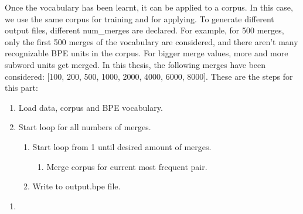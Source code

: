Once the vocabulary has been learnt, it can be applied to a corpus. In this case, we use the same corpus for training and for applying. To generate different output files, different num\_merges are declared. For example, for 500 merges, only the first 500 merges of the vocabulary are considered, and there aren't many recognizable BPE units in the corpus. For bigger merge values, more and more subword units get merged. In this thesis, the following merges have been considered: [100, 200, 500, 1000, 2000, 4000, 6000, 8000]. These are the steps for this part:

\begin{enumerate}
	\item Load data, corpus and BPE vocabulary.
	\item Start loop for all numbers of merges.
	\begin{enumerate}
		\item Start loop from 1 until desired amount of merges.
		\begin{enumerate}
			\item Merge corpus for current most frequent pair.
		\end{enumerate}
		\item Write to output.bpe file.
	\end{enumerate}
\end{enumerate}

\begin{enumerate}
	\item 
\end{enumerate}